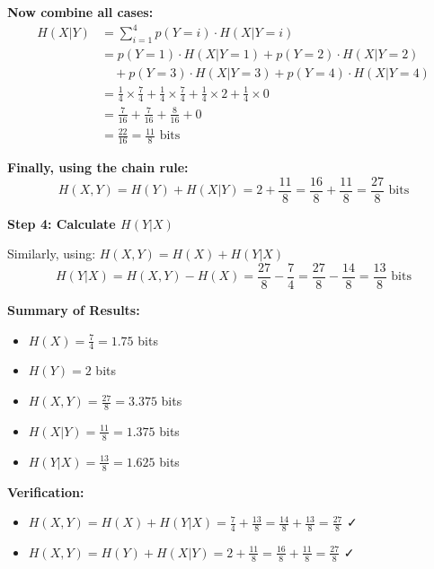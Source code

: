 \documentclass[11pt,a4paper]{book}
\newcounter{qna}[chapter]
\renewcommand{\theqna}{\thechapter.\arabic{qna}}
\newenvironment{questionanswerbox}{
    \refstepcounter{qna}%
    \begin{tcolorbox}[
        enhanced,
        breakable,
        colback=softlavender!10,
        colframe=softlavender!200,
        title={Example~\theqna}, %
        fonttitle=\bfseries,
        coltitle=white,
        colbacktitle=softlavender!200,
        sharp corners,
        boxrule=1pt,
        left=8pt,
        right=8pt,
        top=6pt,
        bottom=6pt
    ]
}{
    \end{tcolorbox}
}
\begin{document}
\begin{questionanswerbox}
    \hrulefill

    \textbf{Now combine all cases:}
    \begin{align*}
        H(X|Y) & = \sum_{i=1}^{4} p(Y=i) \cdot H(X|Y=i)                                                                          \\
               & = p(Y=1) \cdot H(X|Y=1) + p(Y=2) \cdot H(X|Y=2)                                                                 \\
               & \quad + p(Y=3) \cdot H(X|Y=3) + p(Y=4) \cdot H(X|Y=4)                                                           \\
               & = \frac{1}{4} \times \frac{7}{4} + \frac{1}{4} \times \frac{7}{4} + \frac{1}{4} \times 2 + \frac{1}{4} \times 0 \\
               & = \frac{7}{16} + \frac{7}{16} + \frac{8}{16} + 0                                                                \\
               & = \frac{22}{16} = \frac{11}{8} \text{ bits}
    \end{align*}

    \textbf{Finally, using the chain rule:}
    \[
        H(X,Y) = H(Y) + H(X|Y) = 2 + \frac{11}{8} = \frac{16}{8} + \frac{11}{8} = \frac{27}{8} \text{ bits}
    \]

    \textbf{Step 4: Calculate \(H(Y|X)\)}

    Similarly, using: \(H(X,Y) = H(X) + H(Y|X)\)
    \[
        H(Y|X) = H(X,Y) - H(X) = \frac{27}{8} - \frac{7}{4} = \frac{27}{8} - \frac{14}{8} = \frac{13}{8} \text{ bits}
    \]

    \textbf{Summary of Results:}
    \begin{itemize}
        \item \(H(X) = \frac{7}{4} = 1.75\) bits
        \item \(H(Y) = 2\) bits
        \item \(H(X,Y) = \frac{27}{8} = 3.375\) bits
        \item \(H(X|Y) = \frac{11}{8} = 1.375\) bits
        \item \(H(Y|X) = \frac{13}{8} = 1.625\) bits
    \end{itemize}

    \textbf{Verification:}
    \begin{itemize}
        \item \(H(X,Y) = H(X) + H(Y|X) = \frac{7}{4} + \frac{13}{8} = \frac{14}{8} + \frac{13}{8} = \frac{27}{8}\) ✓
        \item \(H(X,Y) = H(Y) + H(X|Y) = 2 + \frac{11}{8} = \frac{16}{8} + \frac{11}{8} = \frac{27}{8}\) ✓
    \end{itemize}
\end{questionanswerbox}
\end{document}
